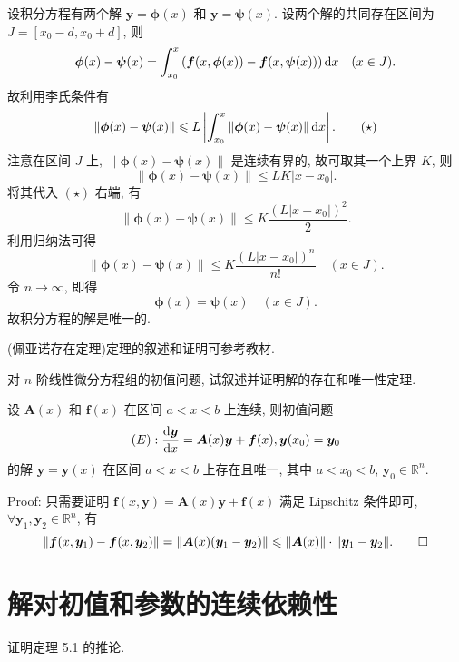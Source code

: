 \begin{solution}
  设积分方程有两个解 $\bm{y}=\bm{\phi}(x)$ 和 $\bm{y}=\bm{\psi}(x)$. 
  设两个解的共同存在区间为 $J=[x_0-d,x_0+d]$, 则
  \[\bm{\phi}(x)-\bm{\psi}(x)=\int_{x_0}^x\left(\bm{f}(x,\bm{\phi}(x))
    -\bm{f}(x,\bm{\psi}(x))\right)\mathop{}\!\mathrm{d} x\quad(x\in J).\]
  故利用李氏条件有
  \begin{equation}
    \|\bm{\phi}(x)-\bm{\psi}(x)\|
    \leqslant L\left|\int_{x_0}^x\|\bm{\phi}(x)-\bm{\psi}(x)\|\mathop{}\!\mathrm{d} x\right|.\tag{$\star$}
  \end{equation}
  注意在区间 $J$ 上, $\|\bm{\phi}(x)-\bm{\psi}(x)\|$ 是连续有界的, 故可取其一个上界 $K$, 则
  \[\|\bm{\phi}(x)-\bm{\psi}(x)\|\leq LK|x-x_0|.\]
  将其代入 $(\star)$ 右端, 有
  \[\|\bm{\phi}(x)-\bm{\psi}(x)\|\leq K\frac{(L|x-x_0|)^2}{2}.\]
  利用归纳法可得
  \[\|\bm{\phi}(x)-\bm{\psi}(x)\|\leq K\frac{(L|x-x_0|)^n}{n!}\quad (x\in J).\]
  令 $n\to\infty$, 即得
  \[\bm{\phi}(x)=\bm{\psi}(x)\quad (x\in J).\]
  故积分方程的解是唯一的.

  (佩亚诺存在定理)定理的叙述和证明可参考教材.
\end{solution}



\begin{exercise}
  对 $n$ 阶线性微分方程组的初值问题, 试叙述并证明解的存在和唯一性定理.
\end{exercise}

\begin{solution} 
  设 $\bm{A}(x)$ 和 $\bm{f}(x)$ 在区间 $a<x<b$ 上连续, 则初值问题
  \[(E):\frac{\mathop{}\!\mathrm{d}\bm{y}}{\mathop{}\!\mathrm{d} x}=\bm{A}(x)\bm{y}+\bm{f}(x),\bm{y}(x_0)=\bm{y}_0\]
  的解 $\bm{y}=\bm{y}(x)$ 在区间 $a<x<b$ 上存在且唯一, 其中 $a<x_0<b$, $\bm{y}_0\in\mathbb{R}^n$.

  Proof: 只需要证明 $\bm{f}(x,\bm{y})=\bm{A}(x)\bm{y}+\bm{f}(x)$ 满足 Lipschitz 条件即可, 
  $\forall\bm{y}_1,\bm{y}_2\in\mathbb{R}^n$, 有
  \[\|\bm{f}(x,\bm{y}_1)-\bm{f}(x,\bm{y}_2)\|
    = \|\bm{A}(x)(\bm{y}_1-\bm{y}_2)\|\leqslant\|\bm{A}(x)\|\cdot\|\bm{y}_1-\bm{y}_2\|.\qedhere\]
\end{solution}



\section{解对初值和参数的连续依赖性}



\begin{exercise}
  证明定理 5.1 的推论.
\end{exercise}



